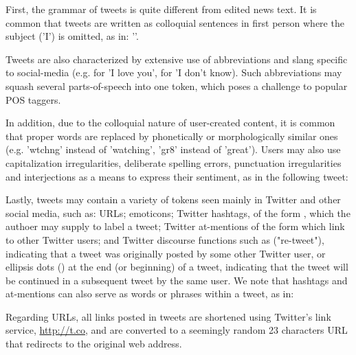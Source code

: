 \documentclass[letterpaper,twocolumn,10pt]{article}
\begin{document}
First, the grammar of tweets is quite different from edited news text. It is common that tweets are written as colloquial sentences in first person where the subject ('I') is omitted, as in: ''.

Tweets are also characterized by extensive use of abbreviations and slang specific to social-media (e.g.  for 'I love you',  for 'I don't know). Such abbreviations may squash several parts-of-speech into one token, which poses a challenge to popular POS taggers.

In addition, due to the colloquial nature of user-created content, it is common that proper words are replaced by phonetically or morphologically similar ones (e.g. 'wtchng' instead of 'watching', 'gr8' instead of 'great'). Users may also use capitalization irregularities, deliberate spelling errors, punctuation irregularities and interjections as a means to express their sentiment, as in the following tweet:

\begin{center}
	\parbox{190pt}{}
\end{center}

Lastly, tweets may contain a variety of tokens seen mainly in Twitter and other social media, such as: URLs; emoticons; Twitter hashtags, of the form , which the authoer may supply to label a tweet; Twitter at-mentions of the form  which link to other Twitter users; and Twitter discourse functions such as  ("re-tweet"), indicating that a tweet was originally posted by some other Twitter user, or ellipsis dots () at the end (or beginning) of a tweet, indicating that the tweet will be continued in a subsequent tweet by the same user. We note that hashtags and at-mentions can also serve as words or phrases within a tweet, as in:

\begin{center}
	\parbox{190pt}{}
\end{center}

Regarding URLs, all links posted in tweets are shortened using Twitter's link service, \url{http://t.co}, and are converted to a seemingly random 23 characters URL that redirects to the original web address.


\end{document}
